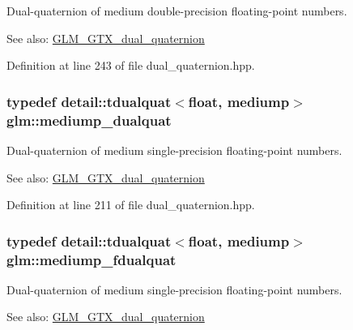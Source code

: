 Dual-quaternion of medium double-precision floating-point numbers.

\begin{Desc}
\item[See also:]\hyperlink{group__gtc__dual__quaternion}{GLM\_\-GTX\_\-dual\_\-quaternion} \end{Desc}


Definition at line 243 of file dual\_\-quaternion.hpp.\hypertarget{group__gtc__dual__quaternion_g71fc1c10a382330c1fee55ce29703405}{
\subsubsection[mediump\_\-dualquat]{\setlength{\rightskip}{0pt plus 5cm}typedef detail::tdualquat$<$float, mediump$>$ {\bf glm::mediump\_\-dualquat}}}
\label{group__gtc__dual__quaternion_g71fc1c10a382330c1fee55ce29703405}


Dual-quaternion of medium single-precision floating-point numbers.

\begin{Desc}
\item[See also:]\hyperlink{group__gtc__dual__quaternion}{GLM\_\-GTX\_\-dual\_\-quaternion} \end{Desc}


Definition at line 211 of file dual\_\-quaternion.hpp.\hypertarget{group__gtc__dual__quaternion_gb211d24786158490e57dfa57d7744f71}{
\subsubsection[mediump\_\-fdualquat]{\setlength{\rightskip}{0pt plus 5cm}typedef detail::tdualquat$<$float, mediump$>$ {\bf glm::mediump\_\-fdualquat}}}
\label{group__gtc__dual__quaternion_gb211d24786158490e57dfa57d7744f71}


Dual-quaternion of medium single-precision floating-point numbers.

\begin{Desc}
\item[See also:]\hyperlink{group__gtc__dual__quaternion}{GLM\_\-GTX\_\-dual\_\-quaternion} \end{Desc}


